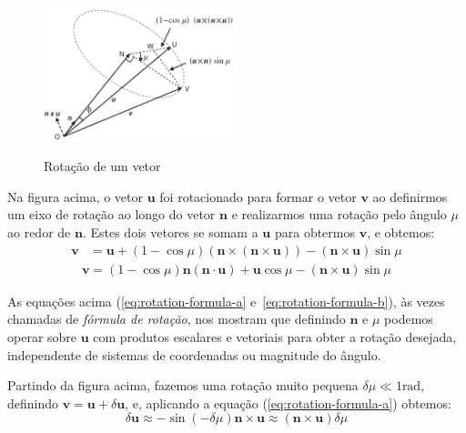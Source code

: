 \begin{figure}[h]
    \centering
    \includegraphics[width=0.5\textwidth, keepaspectratio]{figuras/figure1.2-1.png}\label{fig1.2-1}
    \caption{Rotação de um vetor}\label{fig:rotacao-de-um-vetor}
\end{figure}

Na figura acima, o vetor \(\mathbf{u}\) foi rotacionado para formar o vetor \(\mathbf{v}\) ao definirmos um eixo de rotação ao longo do vetor \(\mathbf{n}\) e realizarmos uma rotação pelo ângulo \(\mu\) ao redor de \(\mathbf{n}\). Estes dois vetores se somam a \(\mathbf{u}\) para obtermos \(\mathbf{v}\), e obtemos:
    \begin{align}
        \mathbf{v} &= \mathbf{u} + \left(1 - {\cos{\mu}}\right) \left(\mathbf{n}\!\times\!\left(\mathbf{n}\!\times\!\mathbf{u}\right)\right) - \left(\mathbf{n}\!\times\!\mathbf{u}\right){\sin{\mu}}\label{eq:rotation-formula-a} %
    \end{align}
    \begin{align}
        \mathbf{v} = \left(1 - {\cos{\mu}}\right) \mathbf{n}\!\left(\mathbf{n}\cdot\mathbf{u}\right) + \mathbf{u}{\cos{\mu}} - \left(\mathbf{n}\!\times\!\mathbf{u}\right){\sin{\mu}} \label{eq:rotation-formula-b}  %
    \end{align}

    As equações acima (\ref{eq:rotation-formula-a} e~\ref{eq:rotation-formula-b}), às vezes chamadas de \textit{fórmula de rotação}, nos mostram que definindo \(\mathbf{n}\) e \(\mu\) podemos operar sobre \(\mathbf{u}\) com produtos escalares e vetoriais para obter a rotação desejada, independente de sistemas de coordenadas ou magnitude do ângulo.

    Partindo da figura acima, fazemos uma rotação muito pequena \(\delta\mu \ll 1 \text{rad}\), definindo \(\mathbf{v} = \mathbf{u} + \delta \mathbf{u}\), e, aplicando a equação (\ref{eq:rotation-formula-a}) obtemos:
\begin{equation*}
    \delta \mathbf{u} \approx -\!\sin(-\delta\mu)\mathbf{n}\!\times\!\mathbf{u} \approx (\mathbf{n}\!\times\!\mathbf{u})\delta\mu
\end{equation*}

